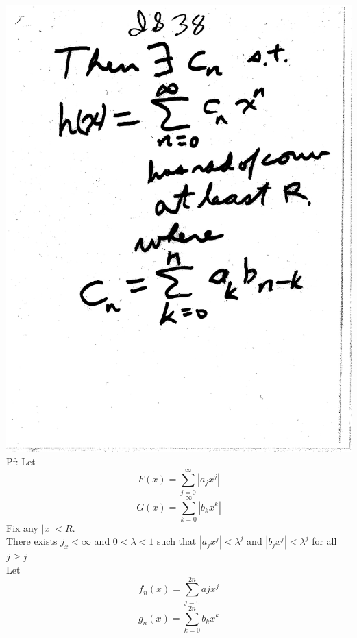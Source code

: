 \documentclass[10pt,a4paper]{article}
\begin{document}
{{\\\includegraphics[scale=0.5]{Pages/InfiniteSeries_38.pdf}
\pagebreak
\\Pf: Let $$F(x)=\sum_{j=0}^{\infty} |a_{j} x^{j}|$$
$$G(x)=\sum_{k=0}^{\infty} |b_{k} x^{k}|$$
Fix any $|x|<R$. 
\\There exists $j_{x}<\infty$ and $0<\lambda <1$ such that $|a_{j} x^{j}|<\lambda^{j}$ and $|b_{j} x^{j}|<\lambda^{j}$ for all $j\geq j$ 
\\Let $$f_{n}(x)=\sum_{j=0}^{2n} a{j}x^{j}$$ $$g_{n}(x)=\sum_{k=0}^{2n} b_{k} x^{k}$$
}}
\end{document}
